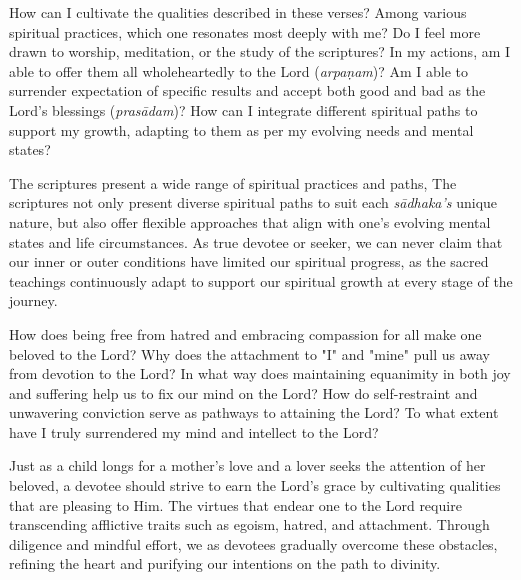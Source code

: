 \newpage
\begin{mananam}{}
\mananamtext\normalfont How can I cultivate the qualities described in these verses?
Among various spiritual practices, which one resonates most deeply with me?  
Do I feel more drawn to worship, meditation, or the study of the scriptures?  
In my actions, am I able to offer them all wholeheartedly to the Lord (\emph{arpaṇam})? Am I able to surrender expectation of specific results and accept both good and bad as the Lord’s blessings (\emph{prasādam})? 
How can I integrate different spiritual paths to support my growth, adapting to them as per my evolving needs and mental states?  
\end{mananam}
\sreflect
\begin{inspiration}{}
\normalfont\mananamtext The scriptures present a wide range of spiritual practices and paths,
The scriptures not only present diverse spiritual paths to suit each \emph{sādhaka’s}
unique nature, but also offer flexible approaches that align with one's evolving mental states and life circumstances. As true devotee or seeker, we can never claim that our inner or outer conditions have limited our spiritual progress, as the sacred teachings continuously adapt to support our spiritual growth at every stage of the journey.
\end{inspiration}
\newpage

\begin{mananam}{}
\normalfont\mananamtext How does being free from hatred and embracing compassion for all make one beloved to the Lord? Why does the attachment to "I" and "mine" pull us away from devotion to the Lord?
In what way does maintaining equanimity in both joy and suffering help us to fix our mind on the Lord? How do self-restraint and unwavering conviction serve as pathways to attaining the Lord?
To what extent have I truly surrendered my mind and intellect to the Lord?
\end{mananam}
\sreflect
\begin{inspiration}{}
\normalfont\mananamtext Just as a child longs for a mother’s love and a lover seeks the attention of her beloved, a devotee should strive to earn the Lord’s grace by cultivating qualities that are pleasing to Him. The virtues that endear one to the Lord require transcending afflictive traits such as egoism, hatred, and attachment. Through diligence and mindful effort, we as devotees gradually overcome these obstacles, refining the heart and purifying our intentions on the path to divinity.
\end{inspiration}
\newpage


